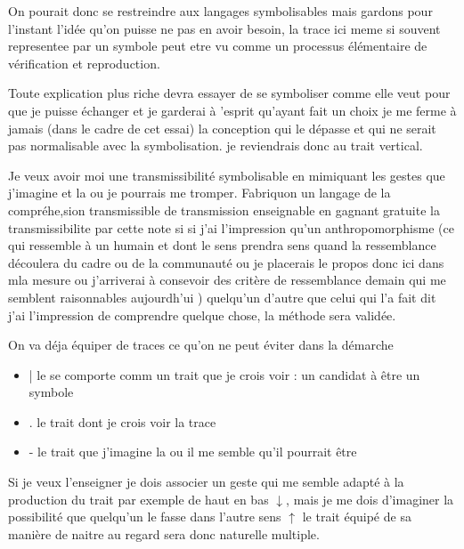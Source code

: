 \documentclass{article}
\begin{document}
On pourait donc se restreindre aux langages symbolisables mais gardons pour l'instant l'idée qu'on puisse ne pas en avoir besoin, la trace ici meme si 
souvent representee par un symbole peut etre vu comme un processus élémentaire de vérification et reproduction.


 

 Toute explication plus riche devra essayer de se symboliser comme elle veut pour que je puisse échanger et je garderai à 'esprit qu'ayant fait un choix je me ferme à jamais (dans le cadre de cet essai) la conception qui le dépasse et qui ne serait pas normalisable avec la symbolisation.
 je reviendrais donc au trait vertical.
 
 Je veux avoir moi une transmissibilité symbolisable en mimiquant les gestes que j'imagine et la ou je pourrais me tromper.
Fabriquon un langage de la compréhe,sion transmissible de transmission enseignable en gagnant gratuite la transmissibilite par cette note si 
si j'ai l'impression qu'un anthropomorphisme (ce qui ressemble à un humain et dont le sens prendra sens quand la ressemblance découlera du cadre ou de la communauté ou je placerais le propos donc ici dans mla mesure ou j'arriverai à consevoir des critère de ressemblance demain qui me semblent raisonnables aujourdh'ui )   quelqu'un d'autre que celui qui l'a fait dit j'ai l'impression de comprendre quelque chose, la méthode sera validée.  
 
On va déja équiper de traces ce qu'on ne peut éviter dans la démarche
\begin{itemize}
\item | le se comporte comm un trait que je crois voir : un candidat à être un symbole
\item . le trait dont je crois voir la trace
\item - le trait que j'imagine la ou il me semble qu'il pourrait être
\end{itemize}
 
 Si je veux l'enseigner je dois associer un geste qui me semble adapté à la production du trait  par exemple de haut en bas $\downarrow$,
 mais je me dois d'imaginer la possibilité que quelqu'un le fasse dans l'autre sens $\uparrow$ le trait 
 équipé de sa manière de naitre au regard  sera donc naturelle multiple. 
 
\end{document}
